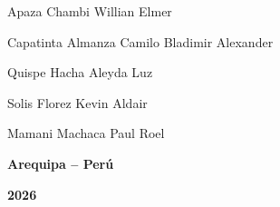 \begin{titlepage}
\begin{minipage}{0.62\textwidth}
{        Apaza Chambi Willian Elmer \par
        Capatinta Almanza Camilo Bladimir Alexander \par
        Quispe Hacha Aleyda Luz \par
        Solis Florez Kevin Aldair \par
        Mamani Machaca Paul Roel \par

  }
\end{minipage}

\vfill

{\fontsize{12.5}{15}\selectfont\bfseries Arequipa -- Perú\par}
\vspace{0.2cm}
{\fontsize{12.5}{15}\selectfont\bfseries 2026 \par} %

\end{titlepage}